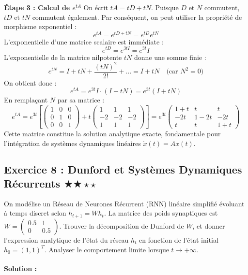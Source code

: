 \documentclass[11pt,a4paper]{article}
\begin{document}
\textbf{Étape 3 : Calcul de $e^{tA}$}
On écrit $tA = tD + tN$.
Puisque $D$ et $N$ commutent, $tD$ et $tN$ commutent également.
Par conséquent, on peut utiliser la propriété de morphisme exponentiel :
$$ e^{tA} = e^{tD + tN} = e^{tD} e^{tN} $$
L'exponentielle d'une matrice scalaire est immédiate :
$$ e^{tD} = e^{3tI} = e^{3t} I $$
L'exponentielle de la matrice nilpotente $tN$ donne une somme finie :
$$ e^{tN} = I + tN + \frac{(tN)^2}{2!} + \dots = I + tN \quad \text{(car } N^2 = 0 \text{)} $$
On obtient donc :
$$ e^{tA} = e^{3t} I \cdot (I + tN) = e^{3t}(I + tN) $$
En remplaçant $N$ par sa matrice :
$$ e^{tA} = e^{3t} \left[ \begin{pmatrix} 1 & 0 & 0 \\ 0 & 1 & 0 \\ 0 & 0 & 1 \end{pmatrix} + t \begin{pmatrix} 1 & 1 & 1 \\ -2 & -2 & -2 \\ 1 & 1 & 1 \end{pmatrix} \right] = e^{3t} \begin{pmatrix} 1+t & t & t \\ -2t & 1-2t & -2t \\ t & t & 1+t \end{pmatrix} $$
Cette matrice constitue la solution analytique exacte, fondamentale pour l'intégration de systèmes dynamiques linéaires $\dot{x}(t) = Ax(t)$.

\vspace{1cm}
\subsection*{Exercice 8 : Dunford et Systèmes Dynamiques Récurrents $\bigstar\bigstar\star\star$}

On modélise un Réseau de Neurones Récurrent (RNN) linéaire simplifié évoluant à temps discret selon $h_{t+1} = W h_t$.
La matrice des poids synaptiques est $W = \begin{pmatrix} 0.5 & 1 \\ 0 & 0.5 \end{pmatrix}$.
Trouver la décomposition de Dunford de $W$, et donner l'expression analytique de l'état du réseau $h_t$ en fonction de l'état initial $h_0 = (1, 1)^T$.
Analyser le comportement limite lorsque $t \to +\infty$.

\paragraph*{Solution :}
\end{document}
